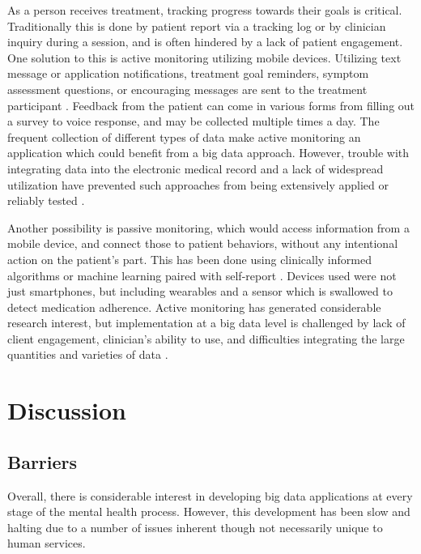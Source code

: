 \documentclass[sigconf]{acmart}
\begin{document}
As a person receives treatment, tracking progress towards their goals is critical. Traditionally this is done by patient report via a tracking log or by clinician inquiry during a session, and is often hindered by a lack of patient engagement. One solution to this is active monitoring utilizing mobile devices. Utilizing text message or application notifications, treatment goal reminders, symptom assessment questions, or encouraging messages are sent to the treatment participant \cite{bitreview}. Feedback from the patient can come in various forms from filling out a survey  to voice response, and may be collected multiple times a day. The frequent collection of different types of data make active monitoring an application which could benefit from a big data approach. However, trouble with integrating data into the electronic medical record and a lack of widespread utilization have prevented such approaches from being extensively applied or reliably tested \cite{bigdatabipolar}.

Another possibility is passive monitoring, which would access information from a mobile device, and connect those to patient behaviors, without any intentional action on the patient's part. This has been done using clinically informed algorithms or machine learning paired with self-report \cite{bitreview}. Devices used were not just smartphones, but including wearables and a sensor which is swallowed to detect medication adherence. Active monitoring has generated considerable research interest, but implementation at a big data level is challenged by lack of client engagement, clinician's ability to use, and difficulties integrating the large quantities and varieties of data \cite{bigdatabipolar}. 

\section{Discussion}

\subsection{Barriers}

Overall, there is considerable interest in developing big data applications at every stage of the mental health process. However, this development has been slow and halting due to a number of issues inherent though not necessarily unique to human services. 
\end{document}
